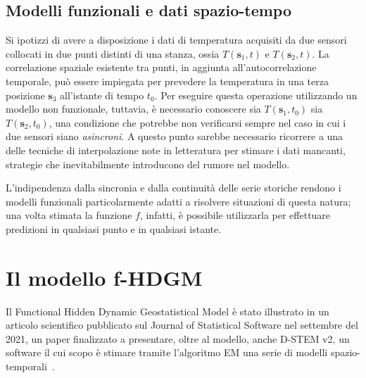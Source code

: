 \subsection[Modelli funzionali e dati spazio-tempo]{Modelli funzionali e dati spazio-tempo}
Si ipotizzi di avere a disposizione i dati di temperatura acquisiti da due sensori collocati in due punti distinti di una stanza, ossia $T(\mathbf{s}_1, t)$ e $T(\mathbf{s}_2, t)$. La correlazione spaziale esistente tra punti, in aggiunta all'autocorrelazione temporale, può essere impiegata per prevedere la temperatura in una terza posizione $\mathbf{s}_3$ all'istante di tempo $t_0$. Per eseguire questa operazione utilizzando un modello non funzionale, tuttavia, è necessario conoscere sia $T(\mathbf{s}_1, t_0)$ sia $T(\mathbf{s}_2, t_0)$, una condizione che potrebbe non verificarsi sempre nel caso in cui i due sensori siano \textit{asincroni}. A questo punto sarebbe necessario ricorrere a una delle tecniche di interpolazione note in letteratura per stimare i dati mancanti, strategie che inevitabilmente introducono del rumore nel modello. \par L'indipendenza dalla sincronia e dalla continuità delle serie storiche rendono i modelli funzionali particolarmente adatti a risolvere situazioni di questa natura; una volta stimata la funzione $f$, infatti, è possibile utilizzarla per effettuare predizioni in qualsiasi punto e in qualsiasi istante.

\section[Il modello f-HDGM]{Il modello f-HDGM}
Il Functional Hidden Dynamic Geostatistical Model è stato illustrato in un articolo scientifico pubblicato sul Journal of Statistical Software nel settembre del \num{2021}, un paper finalizzato a presentare, oltre al modello, anche D-STEM v2, un software il cui scopo è stimare tramite l'algoritmo EM una serie di modelli spazio-temporali~\cite{paper_f_HDGM}.

